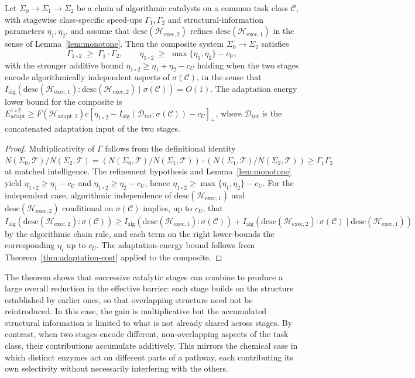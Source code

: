 \documentclass[runningheads]{llncs}
\newcommand{\Erasure}{c}
\newcommand{\Sys}{\Sigma}
\newcommand{\Nop}{N}
\newcommand{\Fover}{F}
\newcommand{\Hw}{\mathcal{H}}
\newcommand{\Task}{\mathcal{T}}
\newcommand{\Class}{\mathcal{C}}
\newcommand{\descop}{\mathrm{desc}}
\newcommand{\Eadapt}{E_{\mathrm{adapt}}}
\newcommand{\MutInfo}{I_{\mathrm{alg}}}
\begin{document}
\begin{theorem}
\label{thm:composition}
Let $\Sys_0\to\Sys_1\to\Sys_2$ be a chain of algorithmic catalysts
on a common task class $\Class$, with stagewise class-specific
speed-ups $\Gamma_1,\Gamma_2$ and structural-information parameters
$\eta_1,\eta_2$, and assume that $\descop(\Hw_{\mathrm{exec},2})$
refines $\descop(\Hw_{\mathrm{exec},1})$ in the sense of
Lemma~\ref{lem:monotone}. Then the composite system
$\Sys_0\to\Sys_2$ satisfies
\begin{equation}
\label{eq:composition}
\Gamma_{1\circ 2}\;\ge\;\Gamma_1\cdot\Gamma_2,
\qquad
\eta_{1\circ 2}\;\ge\;\max\{\eta_1,\eta_2\}-c_U,
\end{equation}
with the stronger additive bound
$\eta_{1\circ 2}\ge\eta_1+\eta_2-c_U$ holding when the two stages
encode algorithmically independent aspects of $\sigma(\Class)$, in
the sense that $\MutInfo(\descop(\Hw_{\mathrm{exec},1}):
\descop(\Hw_{\mathrm{exec},2})\mid\sigma(\Class))=O(1)$. The
adaptation energy lower bound for the composite is
$\Eadapt^{1\circ 2}\ge\Fover(\Hw_{\mathrm{adapt},2})\Erasure
[\eta_{1\circ 2}-\MutInfo(\mathcal{D}_{\mathrm{tot}}:\sigma(\Class))
-c_U]_+$, where $\mathcal{D}_{\mathrm{tot}}$ is the concatenated
adaptation input of the two stages.
\end{theorem}
\begin{proof}
Multiplicativity of $\Gamma$ follows from the definitional
identity
$\Nop(\Sys_0,\Task)/\Nop(\Sys_2,\Task)
=(\Nop(\Sys_0,\Task)/\Nop(\Sys_1,\Task))\cdot
(\Nop(\Sys_1,\Task)/\Nop(\Sys_2,\Task))\ge\Gamma_1\Gamma_2$ at
matched intelligence. The refinement hypothesis and
Lemma~\ref{lem:monotone} yield $\eta_{1\circ 2}\ge\eta_1-c_U$ and
$\eta_{1\circ 2}\ge\eta_2-c_U$, hence
$\eta_{1\circ 2}\ge\max\{\eta_1,\eta_2\}-c_U$. For the independent
case, algorithmic independence of
$\descop(\Hw_{\mathrm{exec},1})$ and $\descop(\Hw_{\mathrm{exec},2})$
conditional on $\sigma(\Class)$ implies, up to $c_U$, that
$\MutInfo(\descop(\Hw_{\mathrm{exec},2}):\sigma(\Class))\ge
\MutInfo(\descop(\Hw_{\mathrm{exec},1}):\sigma(\Class))
+\MutInfo(\descop(\Hw_{\mathrm{exec},2}):\sigma(\Class)\mid
\descop(\Hw_{\mathrm{exec},1}))$ by the algorithmic chain rule,
and each term on the right lower-bounds the corresponding
$\eta_i$ up to $c_U$. The adaptation-energy bound follows from
Theorem~\ref{thm:adaptation-cost} applied to the composite.
\end{proof}

The theorem shows that successive catalytic stages can combine to
produce a large overall reduction in the effective barrier: each
stage builds on the structure established by earlier ones, so that
overlapping structure need not be reintroduced. In this case, the
gain is multiplicative but the accumulated structural information is
limited to what is not already shared across stages. By contrast,
when two stages encode different, non-overlapping aspects of the
task class, their contributions accumulate additively. This mirrors
the chemical case in which distinct enzymes act on different parts
of a pathway, each contributing its own selectivity without necessarily interfering with the others.
\end{document}
